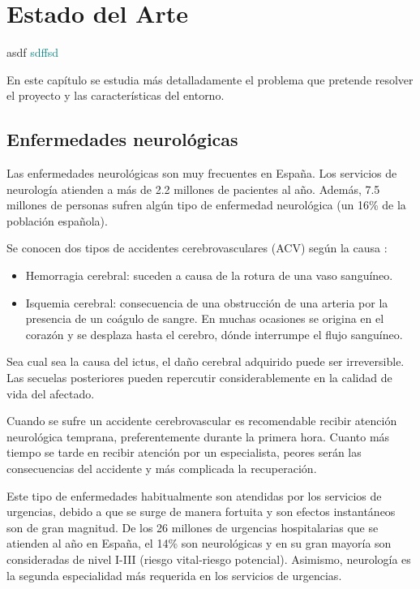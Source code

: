 \chapter{Estado del Arte\label{sec:estado_del_arte}}


\textcolor{rositaoscuro}{asdf}
\textcolor{teal}{sdffsd}


En este capítulo se estudia más detalladamente el problema que pretende resolver el proyecto y las características del entorno.


\section{Enfermedades neurológicas}
\label{sec:dolencias2}

Las enfermedades neurológicas son muy frecuentes en España. Los servicios de neurología atienden a más de 2.2 millones de pacientes al año. Además, 7.5 millones de personas sufren algún tipo de enfermedad neurológica (un 16\% de la población española). 

Se conocen dos tipos de accidentes cerebrovasculares (ACV) según la causa \cite{tipoIctus}:
\begin{itemize}
	\item Hemorragia cerebral: suceden  a causa de la rotura de una vaso sanguíneo.
	\item Isquemia cerebral: consecuencia de una obstrucción de una arteria por la presencia de un coágulo de sangre. En muchas ocasiones se origina en el corazón y se desplaza hasta el cerebro, dónde interrumpe el flujo sanguíneo.
\end{itemize}

Sea cual sea la causa del ictus, el daño cerebral adquirido puede ser irreversible. Las secuelas posteriores pueden repercutir considerablemente en la calidad de vida del afectado.

Cuando se sufre un accidente cerebrovascular es recomendable recibir atención neurológica temprana, preferentemente durante la primera hora. Cuanto más tiempo se tarde en recibir atención por un especialista, peores serán las consecuencias del accidente y más complicada la recuperación.

Este tipo de enfermedades habitualmente son atendidas por los servicios de urgencias, debido a que se surge de manera fortuita y son efectos instantáneos son de gran magnitud. De los 26 millones de urgencias hospitalarias que se atienden al año en España, el 14\% son neurológicas y en su gran mayoría son consideradas de nivel I-III (riesgo vital-riesgo potencial). Asimismo, neurología es la segunda especialidad más requerida en los servicios de urgencias.

